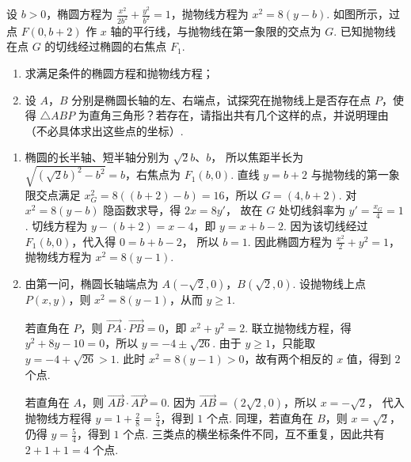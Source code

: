 \begin{problem}
设 \(b > 0\)，椭圆方程为 \(\frac{x^2}{2b^2} + \frac{y^2}{b^2} = 1\)，抛物线方程为 \(x^2 = 8(y - b)\). 如图所示，过点 \(F(0, b + 2)\) 作 \(x\) 轴的平行线，与抛物线在第一象限的交点为 \(G\). 已知抛物线在点 \(G\) 的切线经过椭圆的右焦点 \(F_1\).

\begin{enumerate}
\item 求满足条件的椭圆方程和抛物线方程；
\item 设 \(A\)，\(B\) 分别是椭圆长轴的左、右端点，试探究在抛物线上是否存在点 \(P\)，使得 \(\triangle ABP\) 为直角三角形？若存在，请指出共有几个这样的点，并说明理由（不必具体求出这些点的坐标）.
\end{enumerate}

\end{problem}

\begin{solution}
\begin{enumerate}
\item 椭圆的长半轴、短半轴分别为 \(\sqrt2b\)、\(b\)，
所以焦距半长为 \(\sqrt{(\sqrt2b)^2-b^2}=b\)，右焦点为 \(F_1(b,0)\).
直线 \(y=b+2\) 与抛物线的第一象限交点满足
\(x_G^2=8((b+2)-b)=16\)，所以 \(G=(4,b+2)\).
对 \(x^2=8(y-b)\) 隐函数求导，得 \(2x=8y'\)，
故在 \(G\) 处切线斜率为 \(y'=\frac{x_G}{4}=1\).
切线方程为
\(y-(b+2)=x-4\)，即 \(y=x+b-2\).
因为该切线经过 \(F_1(b,0)\)，代入得 \(0=b+b-2\)，
所以 \(b=1\). 因此椭圆方程为
\(\frac{x^2}{2}+y^2=1\)，抛物线方程为 \(x^2=8(y-1)\).

\item 由第一问，椭圆长轴端点为 \(A(-\sqrt2,0)\)，\(B(\sqrt2,0)\).
设抛物线上点 \(P(x,y)\)，则 \(x^2=8(y-1)\)，从而 \(y\geqslant1\).

若直角在 \(P\)，则
\(\overrightarrow{PA}\cdot\overrightarrow{PB}=0\)，即
\(x^2+y^2=2\). 联立抛物线方程，得
\(y^2+8y-10=0\)，所以
\(y=-4\pm\sqrt{26}\). 由于 \(y\geqslant1\)，只能取
\(y=-4+\sqrt{26}>1\). 此时
\(x^2=8(y-1)>0\)，故有两个相反的 \(x\) 值，得到 \(2\) 个点.

若直角在 \(A\)，则 \(\overrightarrow{AB}\cdot\overrightarrow{AP}=0\).
因为 \(\overrightarrow{AB}=(2\sqrt2,0)\)，所以 \(x=-\sqrt2\)，
代入抛物线方程得 \(y=1+\frac{2}{8}=\frac54\)，得到 \(1\) 个点.
同理，若直角在 \(B\)，则 \(x=\sqrt2\)，仍得 \(y=\frac54\)，得到 \(1\) 个点.
三类点的横坐标条件不同，互不重复，因此共有 \(2+1+1=4\) 个点.
\end{enumerate}
\end{solution}

